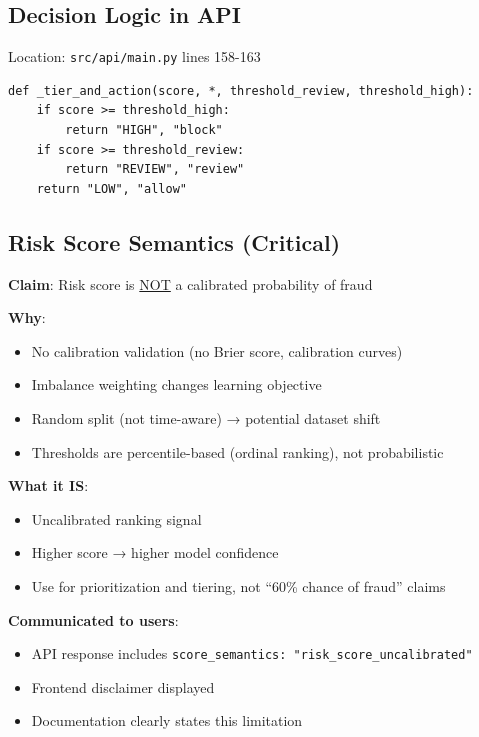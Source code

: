\documentclass[12pt,a4paper]{article}
\newcommand{\code}[1]{\texttt{#1}}
\begin{document}
\subsection{Decision Logic in API}

Location: \code{src/api/main.py} lines 158-163

\begin{lstlisting}
def _tier_and_action(score, *, threshold_review, threshold_high):
    if score >= threshold_high:
        return "HIGH", "block"
    if score >= threshold_review:
        return "REVIEW", "review"
    return "LOW", "allow"
\end{lstlisting}

\subsection{Risk Score Semantics (Critical)}

\textbf{Claim}: Risk score is \underline{NOT} a calibrated probability of fraud

\textbf{Why}: 
\begin{itemize}
    \item No calibration validation (no Brier score, calibration curves)
    \item Imbalance weighting changes learning objective
    \item Random split (not time-aware) → potential dataset shift
    \item Thresholds are percentile-based (ordinal ranking), not probabilistic
\end{itemize}

\textbf{What it IS}:
\begin{itemize}
    \item Uncalibrated ranking signal
    \item Higher score → higher model confidence
    \item Use for prioritization and tiering, not ``60\% chance of fraud'' claims
\end{itemize}

\textbf{Communicated to users}:
\begin{itemize}
    \item API response includes \code{score\_semantics: "risk\_score\_uncalibrated"}
    \item Frontend disclaimer displayed
    \item Documentation clearly states this limitation
\end{itemize}
\end{document}
